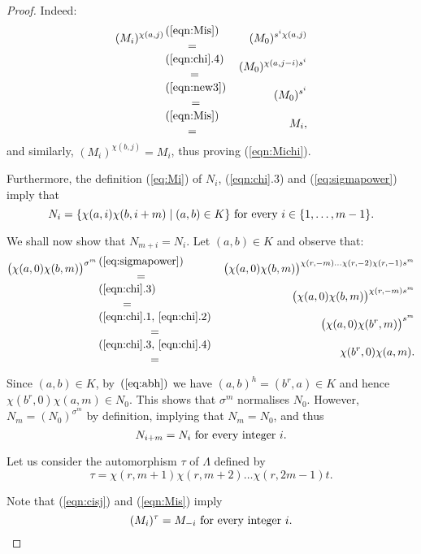 \documentclass{amsart}
\theoremstyle{definition}
\begin{document}
\begin{proof}
Indeed:
 \begin{eqnarray*}
 (M_i)^{\chi(a,j)} & {{(\ref{eqn:Mis})}\atop{=}} &  (M_0)^{s^i \chi(a,j)} \\
                             & {{(\ref{eqn:chi}.4)} \atop{=}} &   (M_0)^{ \chi(a,j-i) s^i} \\
                              & {{(\ref{eqn:new3})} \atop{=}} & (M_0)^{ s^i} \\
                               & {{(\ref{eqn:Mis})}\atop{=}} & M_i,
 \end{eqnarray*}
 and similarly,  $(M_i)^{\chi(b,j)} = M_i$, thus proving (\ref{eqn:Michi}).
\medskip

Furthermore, the definition (\ref{eq:Mi}) of $N_i$, (\ref{eqn:chi}.3) and (\ref{eq:sigmapower}) imply that
\begin{equation}
\label{eqn:Ki}
N_i=\{\chi(a,i)\chi(b,i+m)\mid (a,b)\in K\} \hbox{ for every } i\in \{1,\ldots,m-1\}.
\end{equation} 

We shall now show that $N_{m+i} = N_i$. Let $(a,b)\in K$ and observe that:
\begin{eqnarray*}
\bigl(\chi(a,0)\chi(b,m)\bigr) ^{\sigma^m} 
&{(\ref{eq:sigmapower})}\atop{=}&
\bigl(\chi(a,0)\chi(b,m)\bigr)^{\chi(r,-m)\ldots \chi(r,-2)\chi(r,-1)s^m}\\
&{(\ref{eqn:chi}.3)}\atop{=}&
\bigl(\chi(a,0)\chi(b,m)\bigr)^{\chi(r,-m)s^m}\\
&{(\ref{eqn:chi}.1,\, \ref{eqn:chi}.2)}\atop{=}&
\bigl(\chi(a,0)\chi(b^r,m)\bigr)^{s^m}\\
&{(\ref{eqn:chi}.3,\, \ref{eqn:chi}.4)}\atop{=}&
\chi(b^r,0)\chi(a,m).
\end{eqnarray*}

Since $(a,b)\in K$, by~$(\ref{eq:abh})$ we have $(a,b)^h=(b^r,a)\in K$ and hence $\chi(b^r,0)\chi(a,m)\in N_0$. This shows that $\sigma^m$ normalises $N_0$. However, $N_m = (N_0)^{\sigma^m}$ by definition, implying that $N_m = N_0$, and thus 
\begin{equation}
\label{eqn:Kim}
N_{i+m}=N_i \hbox{ for every integer } i.
\end{equation}

Let us consider the automorphism $\tau$ of $\Lambda$ defined by
\begin{equation}
\label{eqn:tau}
\tau=\chi(r,m+1)\chi(r,m+2) \ldots \chi(r,2m-1)t.
\end{equation}

Note that (\ref{eqn:cisj}) and (\ref{eqn:Mis}) imply
\begin{equation}
\label{eqn:Mit}
(M_i)^\tau= M_{-i} \hbox{ for every integer } i.
\end{equation}


\end{proof}
\end{document}
